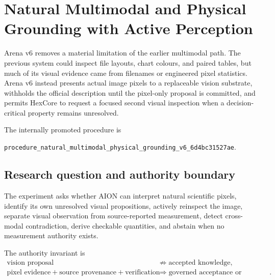 
\section{Natural Multimodal and Physical Grounding with Active Perception}
\label{sec:arena-v6-natural-multimodal}

Arena v6 removes a material limitation of the earlier multimodal path.  The
previous system could inspect file layouts, chart colours, and paired tables,
but much of its visual evidence came from filenames or engineered pixel
statistics.  Arena v6 instead presents actual image pixels to a replaceable
vision substrate, withholds the official description until the pixel-only
proposal is committed, and permits HexCore to request a focused second visual
inspection when a decision-critical property remains unresolved.

The internally promoted procedure is
\begin{center}
{\footnotesize
\texttt{procedure\_natural\_multimodal\_physical\_grounding\_v6\_6d4bc31527ae}}.
\end{center}


\subsection{Research question and authority boundary}
\label{subsec:arena-v6-question}

The experiment asks whether AION can interpret natural scientific pixels,
identify its own unresolved visual propositions, actively reinspect the image,
separate visual observation from source-reported measurement, detect
cross-modal contradiction, derive checkable quantities, and abstain when no
measurement authority exists.

The authority invariant is
\begin{equation}
\begin{aligned}
\text{vision proposal} &\not\Rightarrow \text{accepted knowledge},\\
\text{pixel evidence} + \text{source provenance} + \text{verification}
&\Rightarrow \text{governed acceptance or criticism}.
\end{aligned}
\label{eq:arena-v6-authority}
\end{equation}

